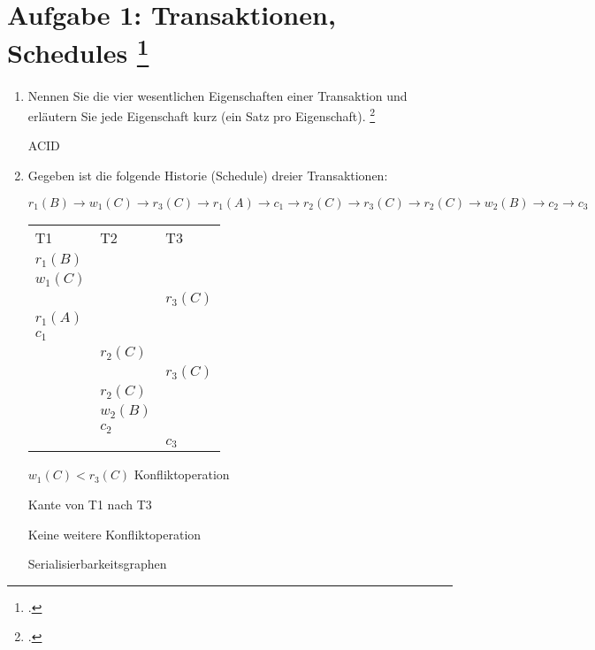 \documentclass{lehramt-informatik-minimal}
\begin{document}
\section{Aufgabe 1: Transaktionen, Schedules
\footcite{db:pu:5}}

\begin{enumerate}

\item Nennen Sie die vier wesentlichen Eigenschaften einer
Transaktion und erläutern Sie jede Eigenschaft kurz (ein Satz pro
Eigenschaft).
\footcite[Thema 1 Teilaufgabe 1 Aufgabe 5]{examen:46116:2016:03}

\begin{antwort}
ACID
\end{antwort}

\item Gegeben ist die folgende Historie (Schedule) dreier Transaktionen:

$
r_1 (B) \rightarrow
w_1 (C) \rightarrow
r_3 (C) \rightarrow
r_1 (A) \rightarrow
c_1 \rightarrow
r_2 (C) \rightarrow
r_3 (C) \rightarrow
r_2 (C) \rightarrow
w_2 (B) \rightarrow
c_2 \rightarrow
c_3
$

\begin{antwort}
\begin{tabular}{lll}
T1 & T2 & T3 \\
$r_1 (B)$ &           &           \\
$w_1 (C)$ &           &           \\
          &           & $r_3 (C)$ \\
$r_1 (A)$ &           &           \\
$c_1$     &           &           \\
          & $r_2 (C)$ &           \\
          &           & $r_3 (C)$ \\
          & $r_2 (C)$ &           \\
          & $w_2 (B)$ &           \\
          & $c_2$     &           \\
          &           & $c_3$     \\
\end{tabular}

$w_1 (C) < r_3 (C)$ Konfliktoperation

Kante von T1 nach T3

Keine weitere Konfliktoperation

Serialisierbarkeitsgraphen


\end{antwort}
\end{enumerate}
\end{document}
